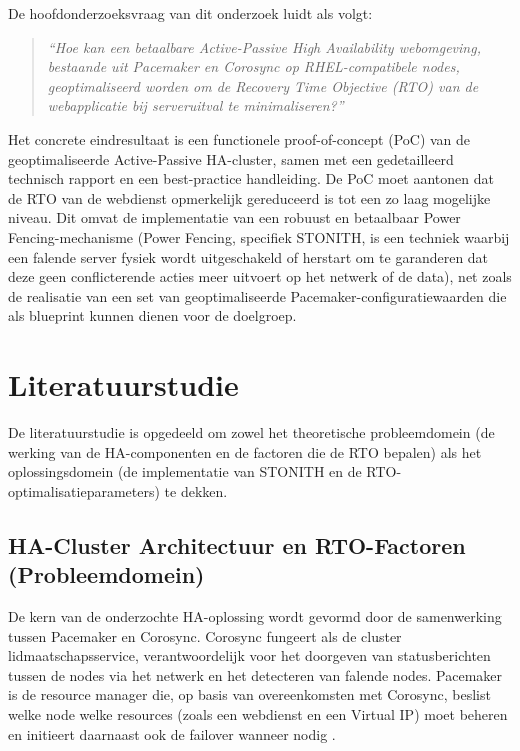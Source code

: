 De hoofdonderzoeksvraag van dit onderzoek luidt als volgt:
\begin{quote}
    \textit{“Hoe kan een betaalbare Active-Passive High Availability webomgeving, bestaande uit Pacemaker en Corosync op RHEL-compatibele nodes, geoptimaliseerd worden om de Recovery Time Objective (RTO) van de webapplicatie bij serveruitval te minimaliseren?”}
\end{quote}
    
Het concrete eindresultaat is een functionele proof-of-concept (PoC) van de geoptimaliseerde Active-Passive HA-cluster, samen met een gedetailleerd technisch rapport en een best-practice handleiding. De PoC moet aantonen dat de RTO van de webdienst opmerkelijk gereduceerd is tot een zo laag mogelijke niveau. Dit omvat de implementatie van een robuust en betaalbaar Power Fencing-mechanisme (Power Fencing, specifiek STONITH, is een techniek waarbij een falende server fysiek wordt uitgeschakeld of herstart om te garanderen dat deze geen conflicterende acties meer uitvoert op het netwerk of de data), net zoals de realisatie van een set van geoptimaliseerde Pacemaker-configuratiewaarden die als blueprint kunnen dienen voor de doelgroep.


\section{Literatuurstudie}%
\label{sec:literatuurstudie}

De literatuurstudie is opgedeeld om zowel het theoretische probleemdomein (de werking van de HA-componenten en de factoren die de RTO bepalen) als het oplossingsdomein (de implementatie van STONITH en de RTO-optimalisatie\-pa\-ra\-me\-ters) te dekken.

\subsection{HA-Cluster Architectuur en RTO-Factoren (Probleemdomein)}

De kern van de onderzochte HA-oplossing wordt gevormd door de samenwerking tussen Pacemaker en Corosync. Corosync fungeert als de cluster lidmaatschapsservice, verantwoordelijk voor het doorgeven van statusberichten tussen de nodes via het netwerk en het detecteren van falende nodes. Pacemaker is de resource manager die, op basis van overeenkomsten met Corosync, beslist welke node welke resources (zoals een webdienst en een Virtual IP) moet beheren en initieert daarnaast ook de failover wanneer nodig \autocite{RedHatClusterWorkshop}.
\medskip

